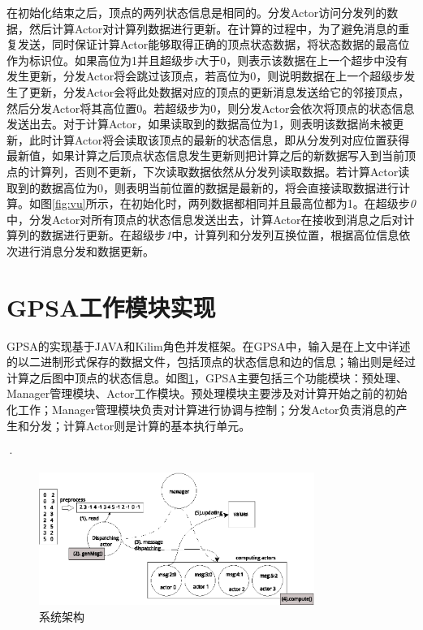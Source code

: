 在初始化结束之后，顶点的两列状态信息是相同的。分发Actor访问分发列的数据，然后计算Actor对计算列数据进行更新。在计算的过程中，为了避免消息的重复发送，同时保证计算Actor能够取得正确的顶点状态数据，将状态数据的最高位作为标识位。如果高位为1并且超级步\textit{i}大于0，则表示该数据在上一个超步中没有发生更新，分发Actor将会跳过该顶点，若高位为0，则说明数据在上一个超级步发生了更新，分发Actor会将此处数据对应的顶点的更新消息发送给它的邻接顶点，然后分发Actor将其高位置0。若超级步为0，则分发Actor会依次将顶点的状态信息发送出去。对于计算Actor，如果读取到的数据高位为1，则表明该数据尚未被更新，此时计算Actor将会读取该顶点的最新的状态信息，即从分发列对应位置获得最新值，如果计算之后顶点状态信息发生更新则把计算之后的新数据写入到当前顶点的计算列，否则不更新，下次读取数据依然从分发列读取数据。若计算Actor读取到的数据高位为0，则表明当前位置的数据是最新的，将会直接读取数据进行计算。如图\ref{fig:vu}所示，在初始化时，两列数据都相同并且最高位都为1。在超级步\textit{0}中，分发Actor对所有顶点的状态信息发送出去，计算Actor在接收到消息之后对计算列的数据进行更新。在超级步\textit{1}中，计算列和分发列互换位置，根据高位信息依次进行消息分发和数据更新。

\section{GPSA工作模块实现}

GPSA的实现基于JAVA和Kilim角色并发框架。在GPSA中，输入是在上文中详述的以二进制形式保存的数据文件，包括顶点的状态信息和边的信息；输出则是经过计算之后图中顶点的状态信息。如图\ref{fig:overview}，GPSA主要包括三个功能模块：预处理、Manager管理模块、Actor工作模块。预处理模块主要涉及对计算开始之前的初始化工作；Manager管理模块负责对计算进行协调与控制；分发Actor负责消息的产生和分发；计算Actor则是计算的基本执行单元。

·
\begin{figure}[htbp]
\centering
\includegraphics[width=0.8\textwidth]{myfigures/newexample.eps}
\caption{系统架构}\label{fig:overview}
\vspace{\baselineskip}
\end{figure}

